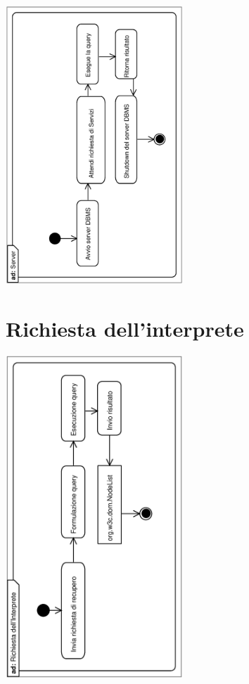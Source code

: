 \documentclass[11pt,titlepage,a4paper]{report}
\begin{document}
\begin{center}
 \includegraphics[width=0.5\textwidth, angle=-90]{Server.eps}
\end{center}


\section{Richiesta dell'interprete}

\begin{center}
 \includegraphics[width=0.5\textwidth, angle=-90]{RichiestadellInterprete.eps}
\end{center}
\end{document}
